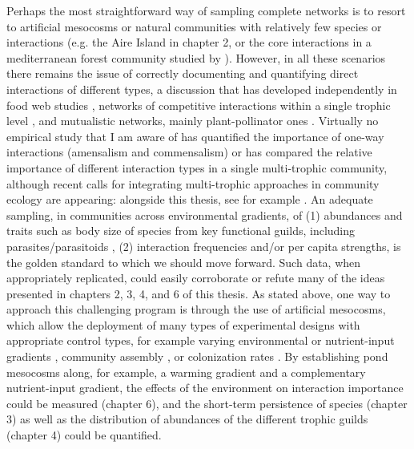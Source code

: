 Perhaps the most straightforward way of sampling complete networks is to resort to artificial mesocosms or natural communities with relatively few species or interactions (e.g. the Aire Island in chapter 2, or the core interactions in a mediterranean forest community studied by \citealt{Sunyer2016}). However, in all these scenarios there remains the issue of correctly documenting and quantifying direct interactions of different types, a discussion that has developed independently in food web studies \citep{Berlow2004, Wootton2005, Novak2010}, networks of competitive interactions within a single trophic level \citep{Freckleton2009a, Hart2018}, and mutualistic networks, mainly plant-pollinator ones \citep{Vazquez2005,Vazquez2007,Holland2002}. Virtually no empirical study that I am aware of has quantified the importance of one-way interactions (amensalism and commensalism) or has compared the relative importance of different interaction types in a single multi-trophic community, although recent calls for integrating multi-trophic approaches in community ecology are appearing: alongside this thesis, see for example \cite{Seibold2018}. An adequate sampling, in communities across environmental gradients, of (1) abundances and traits such as body size of species from key functional guilds, including parasites/parasitoids \citep{Lafferty2006}, (2) interaction frequencies and/or per capita strengths, is the golden standard to which we should move forward. Such data, when appropriately replicated, could easily corroborate or refute many of the ideas presented in chapters 2, 3, 4, and 6 of this thesis. As stated above, one way to approach this challenging program is through the use of artificial mesocosms, which allow the deployment of many types of experimental designs with appropriate control types, for example varying environmental or nutrient-input gradients \citep{Moss2004}, community assembly \citep{Chase2007, Jiang2008}, or colonization rates \citep{Fahimipour2014}. By establishing pond mesocosms along, for example, a warming gradient and a complementary nutrient-input gradient, the effects of the environment on interaction importance could be measured (chapter 6), and the short-term persistence of species (chapter 3) as well as the distribution of abundances of the different trophic guilds (chapter 4) could be quantified.

